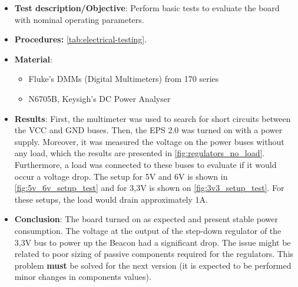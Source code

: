 \begin{itemize}
    \item \textbf{Test description/Objective}: Perform basic tests to evaluate the board with nominal operating parameters.
    \item \textbf{Procedures:} \autoref{tab:electrical-testing}.
    \item \textbf{Material}:
        \begin{itemize}
            \item Fluke's DMMs (Digital Multimeters) from 170 series
            \item N6705B, Keysigh's DC Power Analyser
        \end{itemize}
    \item \textbf{Results}: First, the multimeter was used to search for short circuits between the VCC and GND buses. Then, the EPS 2.0 was turned on with a power supply. Moreover, it was measured the voltage on the power buses without any load, which the results are presented in \autoref{fig:regulators_no_load}. Furthermore, a load was connected to these buses to evaluate if it would occur a voltage drop. The setup for 5V and 6V is shown in \autoref{fig:5v_6v_setup_test} and for 3,3V is shown on \autoref{fig:3v3_setup_test}. For these setups, the load would drain approximately 1A.
    \item \textbf{Conclusion}: The board turned on as expected and present stable power consumption. The voltage at the output of the step-down regulator of the 3,3V bus to power up the Beacon had a significant drop. The issue might be related to poor sizing of passive components required for the regulators. This problem \textbf{must} be solved for the next version (it is expected to be performed minor changes in components values).  
\end{itemize}

